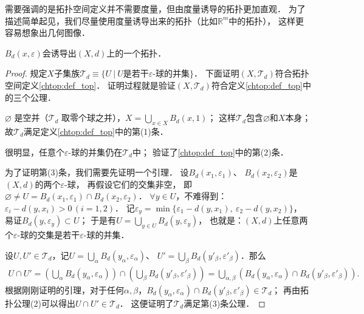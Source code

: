 需要强调的是拓扑空间定义并不需要度量，但由度量诱导的拓扑更加直观．
为了描述简单起见，我们尽量使用度量诱导出来的拓扑（比如$\mathbb{R}^m$中的拓扑），
这样更容易想象出几何图像．


\begin{theorem}\label{chtop:thm_RD}
    $B_{d}(x,\varepsilon)$会诱导出$(X,d)$上的一个拓扑．
\end{theorem}
\begin{proof}
    规定$X$子集族$\mathscr{T}_d \equiv \{
    U\ |\ U \text{是若干$\varepsilon$-球的并集}\}$．
    下面证明$(X, \mathscr{T}_d)$符合拓扑空间定义\ref{chtop:def_top}．
    证明过程就是验证$(X, \mathscr{T}_d)$符合定义\ref{chtop:def_top}中的三个公理．
    
    $\varnothing$ 是空并（$\mathscr T_d$ 取零个球之并），$X=\bigcup_{x\in X}B_d(x,1)$；
    这样$\mathscr{T}_d$包含$\varnothing$和$X$本身；
    故$\mathscr{T}_d$满足定义\ref{chtop:def_top}中的第(1)条．
    
    很明显，任意个$\varepsilon$-球的并集仍在$\mathscr{T}_d$中；
    验证了\ref{chtop:def_top}中的第(2)条．
    
    为了证明第(3)条，我们需要先证明一个引理．
    设$B_{d}(x_1,\varepsilon_1)$、
    $B_{d}(x_2,\varepsilon_2)$是$(X,d)$的两个$\varepsilon$-球，
    再假设它们的交集非空，
    即$\varnothing\neq U= B_{d}(x_1,\varepsilon_1)\cap B_{d}(x_2,\varepsilon_2)$．
    $\forall y \in U$，不难得到：$\varepsilon_i - d(y,x_i) >0 \, (i=1,2)$．
    记$\varepsilon_y= \min \{\varepsilon_1 - d(y,x_1),\ \varepsilon_2 - d(y,x_2)\}$，
    易证$B_{d}(y,\varepsilon_y)\subset U$；
    于是有$U = \bigcup_{y\in U} B_{d}(y,\varepsilon_y)$，
    也就是：{\kaishu $(X,d)$上任意两个$\varepsilon$-球的交集是若干$\varepsilon$-球的并集．}
    
    设$U,U'\in \mathscr{T}_d$，记$U= \bigcup_{\alpha} B_{d}(y_\alpha,\varepsilon_\alpha)$、
    $U'= \bigcup_{\beta} B_{d}(y'_\beta,\varepsilon'_\beta)$．那么
    \begin{align*}
        U \cap U' = \left( \bigcup_{\alpha} B_{d}(y_\alpha,\varepsilon_\alpha) \right)
        \cap \left( \bigcup_{\beta} B_{d}(y'_\beta,\varepsilon'_\beta) \right)
        = \bigcup_{\alpha,\beta }\left( B_{d}(y_\alpha,\varepsilon_\alpha)
        \cap B_{d}(y'_\beta,\varepsilon'_\beta) \right).
    \end{align*}
    根据刚刚证明的引理，对于任何$\alpha,\beta$，$B_{d}(y_\alpha,\varepsilon_\alpha)
    \cap B_{d}(y'_\beta,\varepsilon'_\beta) \in \mathscr{T}_d$；
    再由拓扑公理(2)可以得出$U\cap U'\in \mathscr{T}_d$．
    这便证明了$\mathscr{T}_d$满足第(3)条公理．
\end{proof}

